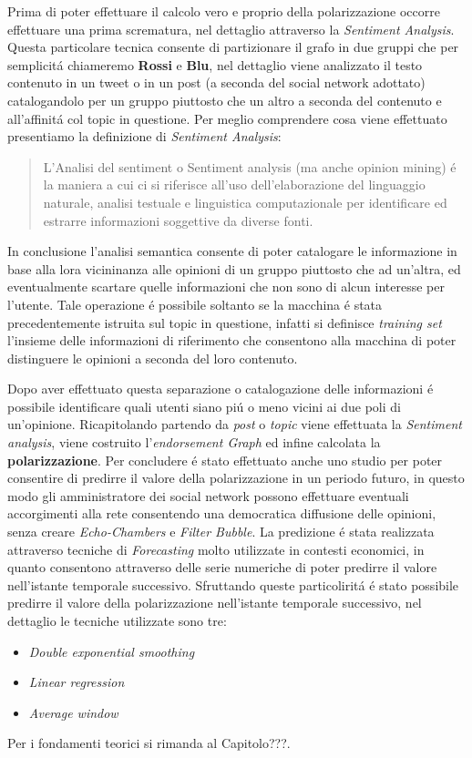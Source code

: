 Prima di poter effettuare il calcolo vero e proprio della polarizzazione occorre effettuare una prima scrematura, nel dettaglio attraverso la \textit{Sentiment Analysis}. Questa particolare tecnica consente di partizionare il grafo in due gruppi che per semplicit\'a chiameremo \textbf{Rossi} e \textbf{Blu}, nel dettaglio viene analizzato il testo contenuto in un tweet o in un post (a seconda del social network adottato) catalogandolo per un gruppo piuttosto che un altro a seconda del contenuto e all'affinit\'a col topic in questione. 
Per meglio comprendere cosa viene effettuato presentiamo la definizione di \textit{Sentiment Analysis}:
\begin{quote}
L'Analisi del sentiment o Sentiment analysis (ma anche opinion mining) \'e la maniera a cui ci si riferisce all'uso dell'elaborazione del linguaggio naturale, analisi testuale e linguistica computazionale per identificare ed estrarre informazioni soggettive da diverse fonti. 
\end{quote}

In conclusione l'analisi semantica consente di poter catalogare le informazione in base alla lora vicininanza alle opinioni di un gruppo piuttosto che ad un'altra, ed eventualmente scartare quelle informazioni che non sono di alcun interesse per l'utente. Tale operazione \'e possibile soltanto se la macchina \'e stata precedentemente istruita sul topic in questione, infatti si definisce \textit{training set} l'insieme delle informazioni di riferimento che consentono alla macchina di poter distinguere le opinioni a seconda del loro contenuto.

Dopo aver effettuato questa separazione o catalogazione delle informazioni \'e possibile identificare quali utenti siano pi\'u o meno vicini ai due poli di un'opinione. Ricapitolando partendo da \textit{post} o \textit{topic} viene effettuata la \textit{Sentiment analysis}, viene costruito l'\textit{endorsement Graph} ed infine calcolata la \textbf{polarizzazione}. 
Per concludere \'e stato effettuato anche uno studio per poter consentire di predirre il valore della polarizzazione in un periodo futuro, in questo modo gli amministratore dei social network possono effettuare eventuali accorgimenti alla rete consentendo una democratica diffusione delle opinioni, senza creare \textit{Echo-Chambers} e \textit{Filter Bubble}.  
La predizione \'e stata realizzata attraverso tecniche di \textit{Forecasting} molto utilizzate in contesti economici, in quanto consentono attraverso delle serie numeriche di poter predirre il valore nell'istante temporale successivo. Sfruttando queste particolirit\'a \'e stato possibile predirre il valore della polarizzazione nell'istante temporale successivo, nel dettaglio le tecniche utilizzate sono tre:
\begin{itemize}
\item \textit{Double exponential smoothing}
\item \textit{Linear regression}
\item \textit{Average window}
\end{itemize}
Per i fondamenti teorici si rimanda al Capitolo???.

